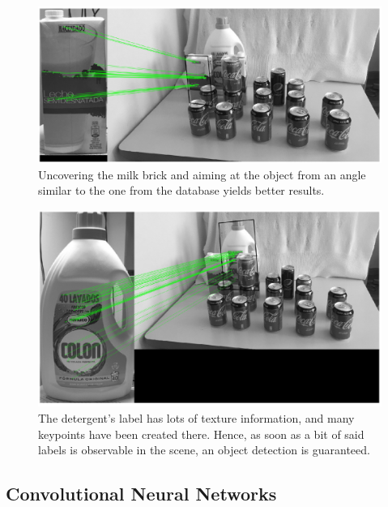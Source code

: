 \documentclass[../main.tex]{subfiles}
\begin{document}
\begin{figure}[H]
    \centering
    \includegraphics[width=1.0\linewidth]{images/sift_hidden_milk_ok.png}
    \caption{Uncovering the milk brick and aiming at the object from an angle similar to the one from the database yields better results.}
    \label{fig:sift_hidden_milk_ok}
\end{figure}

\begin{figure}[H]
    \centering
    \includegraphics[width=1.0\linewidth]{images/sift_hidden_detergent.png}
    \caption{The detergent's label has lots of texture information, and many keypoints have been created there. Hence, as soon as a bit of said labels is observable in the scene, an object detection is guaranteed. }
    \label{fig:sift_hidden_detergent}
\end{figure}


\subsection{Convolutional Neural Networks} \label{sec:world_neural_networks}
\end{document}
